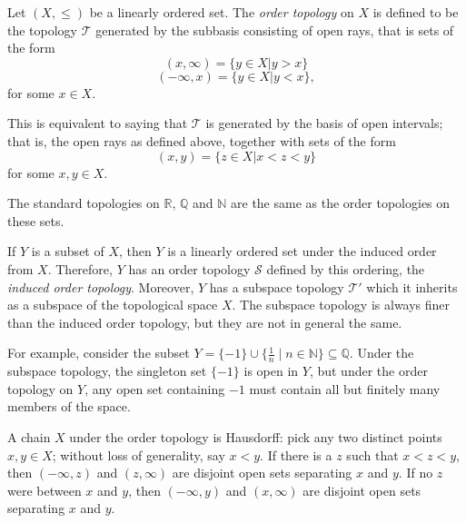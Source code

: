 \documentclass[12pt]{article}
\begin{document}
Let $(X,\leq)$ be a linearly ordered set.  The \emph{order topology} on $X$ is defined to be the topology $\mathcal{T}$ generated by the subbasis consisting of open rays, that is sets of the form $$(x,\infty)=\{ y\in X|y>x\}$$ $$(-\infty,x)=\{ y\in X|y<x\},$$
for some $x\in X$.

This is equivalent to saying that $\mathcal{T}$ is generated by the basis of open intervals; that is, the open rays as defined above, together with sets of the form $$(x,y)=\{ z\in X|x<z<y\}$$ for some $x,y\in X$.

The standard topologies on $\mathbb{R}$, $\mathbb{Q}$ and $\mathbb{N}$ are the same as the order topologies on these sets.

If $Y$ is a subset of $X$, then $Y$ is a linearly ordered set under the induced order from $X$.  Therefore, $Y$ has an order topology $\mathcal{S}$ defined by this ordering, the \emph{induced order topology}.  Moreover, $Y$ has a subspace topology $\mathcal{T}'$ which it inherits as a subspace of the topological space $X$.  The subspace topology is always finer than the induced order topology, but they are not in general the same.

For example, consider the subset $Y=\{ -1\}\cup\{ \frac{1}{n} \mid n\in\mathbb{N}\}\subseteq\mathbb{Q}$.  Under the subspace topology, the singleton set $\{ -1\}$ is open in $Y$, but under the order topology on $Y$, 
any open set containing $-1$ must contain all but finitely many members of the space.

A chain $X$ under the order topology is Hausdorff: pick any two distinct points $x, y \in X$; without loss of generality, say $x < y$.    If there is a $z$ such that $x < z < y$, then $(-\infty,z)$ and $(z,\infty)$ are disjoint open sets separating $x$ and $y$.  If no $z$ were between $x$ and $y$, then $(-\infty,y)$ and $(x,\infty)$ are disjoint open sets separating $x$ and $y$.
\end{document}
